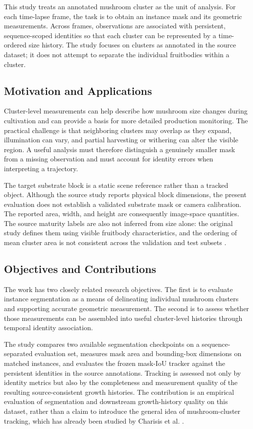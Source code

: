 \documentclass[11pt,a4paper]{article}
\begin{document}
This study treats an annotated mushroom cluster as the unit of analysis. For each time-lapse frame, the task is to obtain an instance mask and its geometric measurements. Across frames, observations are associated with persistent, sequence-scoped identities so that each cluster can be represented by a time-ordered size history. The study focuses on clusters as annotated in the source dataset; it does not attempt to separate the individual fruitbodies within a cluster.

\subsection{Motivation and Applications}

Cluster-level measurements can help describe how mushroom size changes during cultivation and can provide a basis for more detailed production monitoring. The practical challenge is that neighboring clusters may overlap as they expand, illumination can vary, and partial harvesting or withering can alter the visible region. A useful analysis must therefore distinguish a genuinely smaller mask from a missing observation and must account for identity errors when interpreting a trajectory.

The target substrate block is a static scene reference rather than a tracked object. Although the source study reports physical block dimensions, the present evaluation does not establish a validated substrate mask or camera calibration. The reported area, width, and height are consequently image-space quantities. The source maturity labels are also not inferred from size alone: the original study defines them using visible fruitbody characteristics, and the ordering of mean cluster area is not consistent across the validation and test subsets \cite{charisis}.

\subsection{Objectives and Contributions}

The work has two closely related research objectives. The first is to evaluate instance segmentation as a means of delineating individual mushroom clusters and supporting accurate geometric measurement. The second is to assess whether those measurements can be assembled into useful cluster-level histories through temporal identity association.

The study compares two available segmentation checkpoints on a sequence-separated evaluation set, measures mask area and bounding-box dimensions on matched instances, and evaluates the frozen mask-IoU tracker against the persistent identities in the source annotations. Tracking is assessed not only by identity metrics but also by the completeness and measurement quality of the resulting source-consistent growth histories. The contribution is an empirical evaluation of segmentation and downstream growth-history quality on this dataset, rather than a claim to introduce the general idea of mushroom-cluster tracking, which has already been studied by Charisis et al. \cite{charisis}.
\end{document}
